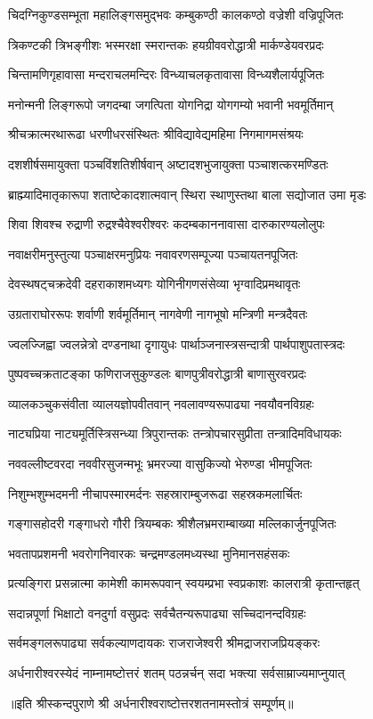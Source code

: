 \twolineshloka
{चिदग्निकुण्डसम्भूता महालिङ्गसमुद्भवः}
{कम्बुकण्ठी कालकण्ठो वज्रेशी वज्रिपूजितः}%

\twolineshloka
{त्रिकण्टकी त्रिभङ्गीशः भस्मरक्षा स्मरान्तकः}
{हयग्रीववरोद्धात्री मार्कण्डेयवरप्रदः}%

\twolineshloka
{चिन्तामणिगृहावासा मन्दराचलमन्दिरः}
{विन्ध्याचलकृतावासा विन्ध्यशैलार्यपूजितः}%

\twolineshloka
{मनोन्मनी लिङ्गरूपो जगदम्बा जगत्पिता}
{योगनिद्रा योगगम्यो भवानी भवमूर्तिमान्}%

\twolineshloka
{श्रीचक्रात्मरथारूढा धरणीधरसंस्थितः}
{श्रीविद्यावेद्यमहिमा निगमागमसंश्रयः}%

\twolineshloka
{दशशीर्षसमायुक्ता पञ्चविंशतिशीर्षवान्}
{अष्टादशभुजायुक्ता पञ्चाशत्करमण्डितः}%

\twolineshloka
{ब्राह्म्यादिमातृकारूपा शताष्टेकादशात्मवान्}
{स्थिरा स्थाणुस्तथा बाला सद्योजात उमा मृडः}%

\twolineshloka
{शिवा शिवश्च रुद्राणी रुद्रश्चैवेश्वरीश्वरः}
{कदम्बकाननावासा दारुकारण्यलोलुपः}%

\twolineshloka
{नवाक्षरीमनुस्तुत्या पञ्चाक्षरमनुप्रियः}
{नवावरणसम्पूज्या पञ्चायतनपूजितः}%

\twolineshloka
{देवस्थषट्चक्रदेवी दहराकाशमध्यगः}
{योगिनीगणसंसेव्या भृग्वादिप्रमथावृतः}%

\twolineshloka
{उग्रताराघोररूपः शर्वाणी शर्वमूर्तिमान्}
{नागवेणी नागभूषो मन्त्रिणी मन्त्रदैवतः}%

\twolineshloka
{ज्वलज्जिह्वा ज्वलन्नेत्रो दण्डनाथा दृगायुधः}
{पार्थाञ्जनास्त्रसन्दात्री पार्थपाशुपतास्त्रदः}%

\twolineshloka
{पुष्पवच्चक्रताटङ्का फणिराजसुकुण्डलः}
{बाणपुत्रीवरोद्धात्री बाणासुरवरप्रदः}%

\twolineshloka
{व्यालकञ्चुकसंवीता व्यालयज्ञोपवीतवान्}
{नवलावण्यरूपाढ्या नवयौवनविग्रहः}%

\twolineshloka
{नाट्यप्रिया नाट्यमूर्तिस्त्रिसन्ध्या त्रिपुरान्तकः}
{तन्त्रोपचारसुप्रीता तन्त्रादिमविधायकः}%

\twolineshloka
{नववल्लीष्टवरदा नववीरसुजन्मभूः}
{भ्रमरज्या वासुकिज्यो भेरुण्डा भीमपूजितः}%

\twolineshloka
{निशुम्भशुम्भदमनी नीचापस्मारमर्दनः}
{सहस्राराम्बुजरूढा सहस्रकमलार्चितः}%

\twolineshloka
{गङ्गासहोदरी गङ्गाधरो गौरी त्रियम्बकः}
{श्रीशैलभ्रमराम्बाख्या मल्लिकार्जुनपूजितः}%

\twolineshloka
{भवतापप्रशमनी भवरोगनिवारकः}
{चन्द्रमण्डलमध्यस्था मुनिमानसहंसकः}%

\twolineshloka
{प्रत्यङ्गिरा प्रसन्नात्मा कामेशी कामरूपवान्}
{स्वयम्प्रभा स्वप्रकाशः कालरात्री कृतान्तहृत्}%

\twolineshloka
{सदान्नपूर्णा भिक्षाटो वनदुर्गा वसुप्रदः}
{सर्वचैतन्यरूपाढ्या सच्चिदानन्दविग्रहः}%

\twolineshloka
{सर्वमङ्गलरूपाढ्या सर्वकल्याणदायकः}
{राजराजेश्वरी श्रीमद्राजराजप्रियङ्करः}%

\twolineshloka
{अर्धनारीश्वरस्येदं नाम्नामष्टोत्तरं शतम्}
{पठन्नर्चन् सदा भक्त्या सर्वसाम्राज्यमाप्नुयात्}%

॥इति श्रीस्कन्दपुराणे श्री अर्धनारीश्वराष्टोत्तरशतनामस्तोत्रं सम्पूर्णम्॥
